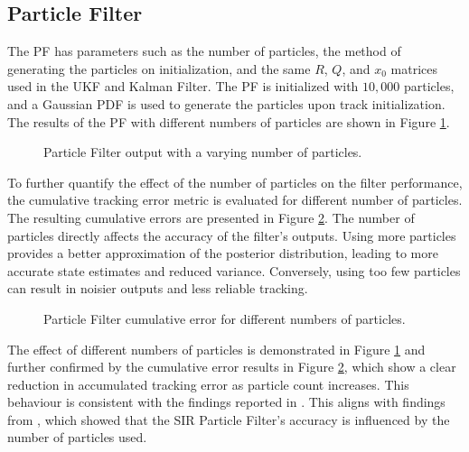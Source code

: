 \subsection{Particle Filter}
The \ac{PF} has parameters such as the number of particles, the method of generating the particles on initialization, and the same \(R\), \(Q\), and \(x_0\) matrices used in the \ac{UKF} and Kalman Filter. The \ac{PF} is initialized with \(10,000\) particles, and a Gaussian \ac{PDF} is used to generate the particles upon track initialization. The results of the \ac{PF} with different numbers of particles are shown in Figure \ref{fig:particle_filter_results}.
\begin{figure}[H]
    \centering
    
    \caption{Particle Filter output with a varying number of particles.}
    \label{fig:particle_filter_results}
\end{figure}
To further quantify the effect of the number of particles on the filter performance, the cumulative tracking error metric is evaluated for different number of particles. The resulting cumulative errors are presented in Figure \ref{fig:particle_filter_cum_error}. The number of particles directly affects the accuracy of the filter's outputs. Using more particles provides a better approximation of the posterior distribution, leading to more accurate state estimates and reduced variance. Conversely, using too few particles can result in noisier outputs and less reliable tracking.
\begin{figure}[ht!]
    \centering
    
    \caption{Particle Filter cumulative error for different numbers of particles.}
    \label{fig:particle_filter_cum_error}
\end{figure}
 The effect of different numbers of particles is demonstrated in Figure \ref{fig:particle_filter_results} and further confirmed by the cumulative error results in Figure \ref{fig:particle_filter_cum_error}, which show a clear reduction in accumulated tracking error as particle count increases. This behaviour is consistent with the findings reported in \cite{Bauermeister2016}. This aligns with findings from \cite{Bauermeister2016}, which showed that the \ac{SIR} Particle Filter's accuracy is influenced by the number of particles used.


